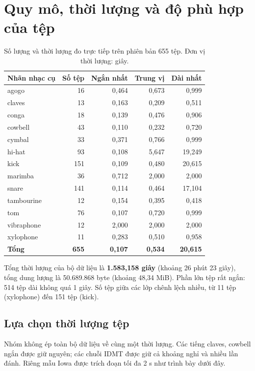 \documentclass[11pt,a4paper]{article}
\begin{document}
\section{Quy mô, thời lượng và độ phù hợp của tệp}\label{sec:quymo}
\begin{table}[htbp]
\centering
\caption{Số lượng và thời lượng đo trực tiếp trên phiên bản 655 tệp. Đơn vị thời lượng: giây.}\label{tab:thoiluong}
\begin{tabular}{lrrrr}
\toprule
Nhãn nhạc cụ & Số tệp & Ngắn nhất & Trung vị & Dài nhất\\\midrule
agogo & 16 & 0,464 & 0,673 & 0,999 \\
claves & 13 & 0,163 & 0,209 & 0,511 \\
conga & 18 & 0,139 & 0,476 & 0,906 \\
cowbell & 43 & 0,110 & 0,232 & 0,720 \\
cymbal & 33 & 0,371 & 0,766 & 0,999 \\
hi-hat & 93 & 0,108 & 5,647 & 19,249 \\
kick & 151 & 0,109 & 0,480 & 20,615 \\
marimba & 36 & 0,712 & 2,000 & 2,000 \\
snare & 141 & 0,114 & 0,464 & 17,104 \\
tambourine & 12 & 0,154 & 0,395 & 0,418 \\
tom & 76 & 0,107 & 0,720 & 0,999 \\
vibraphone & 12 & 2,000 & 2,000 & 2,000 \\
xylophone & 11 & 0,283 & 0,510 & 0,958 \\
\midrule
\textbf{Tổng} & \textbf{655} & \textbf{0,107} & \textbf{0,534} & \textbf{20,615}\\\bottomrule
\end{tabular}
\end{table}
Tổng thời lượng của bộ dữ liệu là \textbf{1.583,158 giây} (khoảng 26 phút 23 giây), tổng dung lượng là 50.689.868 byte (khoảng 48,34 MiB). Phần lớn tệp rất ngắn: 514 tệp dài không quá 1 giây. Số tệp giữa các lớp chênh lệch nhiều, từ 11 tệp (xylophone) đến 151 tệp (kick).

\subsection{Lựa chọn thời lượng tệp}
Nhóm không ép toàn bộ dữ liệu về cùng một thời lượng. Các tiếng claves, cowbell ngắn được giữ nguyên; các chuỗi IDMT được giữ cả khoảng nghỉ và nhiều lần đánh. Riêng mẫu Iowa được trích đoạn tối đa 2 s như trình bày dưới đây.
\end{document}
